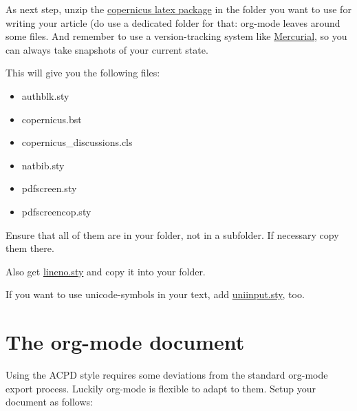 \documentclass[11pt]{article}
\begin{document}
As next step, unzip the \href{http://www.atmospheric-chemistry-and-physics.net/Copernicus_LaTeX_Package_v_2_7.zip}{copernicus latex package} in the folder you want to use for writing your article (do use a dedicated folder for that: org-mode leaves around some files. And remember to use a version-tracking system like \href{http://mercurial.selenic.com}{Mercurial}, so you can always take snapshots of your current state.

This will give you the following files:

\begin{itemize}
\item authblk.sty
\item copernicus.bst
\item copernicus\_discussions.cls
\item natbib.sty
\item pdfscreen.sty
\item pdfscreencop.sty
\end{itemize}

Ensure that all of them are in your folder, not in a subfolder. If necessary copy them there.

Also get \href{http://tug.ctan.org/tex-archive/macros/latex/contrib/lineno/lineno.sty}{lineno.sty} and copy it into your folder.

If you want to use unicode-symbols in your text, add \href{http://wiki.neo-layout.org/attachment/ticket/317/uniinput.sty}{uniinput.sty}, too.

\section*{The org-mode document}
\label{sec-3}

Using the ACPD style requires some deviations from the standard org-mode export process. Luckily org-mode is flexible to adapt to them. Setup your document as follows:

\newpage
\tiny
\end{document}
